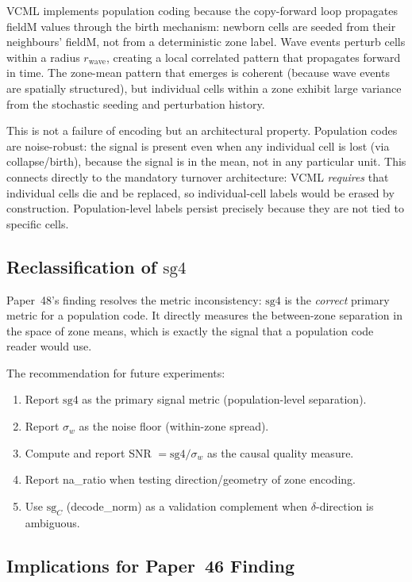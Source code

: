\documentclass[11pt,a4paper]{article}
\begin{document}
VCML implements population coding because the copy-forward loop propagates
fieldM values through the birth mechanism: newborn cells are seeded from
their neighbours' fieldM, not from a deterministic zone label.  Wave events
perturb cells within a radius $r_\text{wave}$, creating a local correlated
pattern that propagates forward in time.  The zone-mean pattern that emerges
is coherent (because wave events are spatially structured), but individual
cells within a zone exhibit large variance from the stochastic seeding and
perturbation history.

This is not a failure of encoding but an architectural property.  Population
codes are noise-robust: the signal is present even when any individual
cell is lost (via collapse/birth), because the signal is in the mean, not
in any particular unit.  This connects directly to the mandatory turnover
architecture: VCML \emph{requires} that individual cells die and be replaced,
so individual-cell labels would be erased by construction.  Population-level
labels persist precisely because they are not tied to specific cells.

\subsection{Reclassification of $\mathrm{sg4}$}

Paper~48's finding resolves the metric inconsistency: $\mathrm{sg4}$ is the
\emph{correct} primary metric for a population code.  It directly measures
the between-zone separation in the space of zone means, which is exactly
the signal that a population code reader would use.

The recommendation for future experiments:
\begin{enumerate}
  \item Report $\mathrm{sg4}$ as the primary signal metric (population-level separation).
  \item Report $\sigma_w$ as the noise floor (within-zone spread).
  \item Compute and report SNR $= \mathrm{sg4}/\sigma_w$ as the causal quality measure.
  \item Report na\_ratio when testing direction/geometry of zone encoding.
  \item Use $\mathrm{sg}_C$ (decode\_norm) as a validation complement when
        $\delta$-direction is ambiguous.
\end{enumerate}

\subsection{Implications for Paper~46 Finding}
\end{document}
